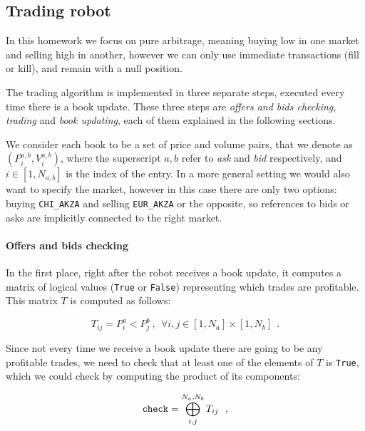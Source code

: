 \documentclass[8 pt]{article}
\begin{document}
\begin{multicols*}{2}

  \section{Trading robot}

  In this homework we focus on pure arbitrage, meaning buying low in one market and selling high in another, however we can only use immediate transactions (fill or kill), and remain with a null position.

  The trading algorithm is implemented in three separate steps, executed every time there is a book update. These three steps are \emph{offers and bids checking}, \emph{trading} and \emph{book updating}, each of them explained in the following sections.

  We consider each book to be a set of price and volume pairs, that we denote as $(P^{a,b}_i, V^{a,b}_i)$, where the superscript $a, b$ refer to \emph{ask} and \emph{bid} respectively, and $i\in [1, N_{a,b}]$ is the index of the entry. In a more general setting we would also want to specify the market, however in this case there are only two options: buying \texttt{CHI\_AKZA} and selling \texttt{EUR\_AKZA} or the opposite, so references to bids or asks are implicitly connected to the right market.  

  \paragraph{Offers and bids checking}

  In the first place, right after the robot receives a book update, it computes a matrix of logical values (\texttt{True} or \texttt{False}) representing which trades are profitable. This matrix $T$ is computed as follows:

  \begin{equation*}
    T_{ij} = P^a_i < P^b_j ~,~~ \forall i,j \in [1, N_a]\times[1, N_b] ~~.
  \end{equation*}

  Since not every time we receive a book update there are going to be any profitable trades, we need to check that at least one of the elements of $T$ is \texttt{True}, which we could check by computing the product of its components:

  \begin{equation*}
    \text{\texttt{check}} = \bigoplus_{i, j}^{N_a, N_b} T_{ij} ~~,
  \end{equation*}


\end{multicols*}
\end{document}

